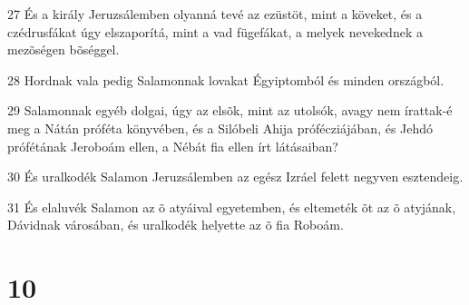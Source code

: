 \par 27 És a király Jeruzsálemben olyanná tevé az ezüstöt, mint a köveket, és a czédrusfákat úgy elszaporítá, mint a vad fügefákat, a melyek nevekednek a mezõségen bõséggel.
\par 28 Hordnak vala pedig Salamonnak lovakat Égyiptomból és minden országból.
\par 29 Salamonnak egyéb dolgai, úgy az elsõk, mint az utolsók, avagy nem írattak-é meg a Nátán próféta könyvében, és a Silóbeli Ahija prófécziájában, és Jehdó prófétának Jeroboám ellen, a Nébát fia ellen írt látásaiban?
\par 30 És uralkodék Salamon Jeruzsálemben az egész Izráel felett negyven esztendeig.
\par 31 És elaluvék Salamon az õ atyáival egyetemben, és eltemeték õt az õ atyjának, Dávidnak városában, és uralkodék helyette az õ fia Roboám.

\chapter{10}

